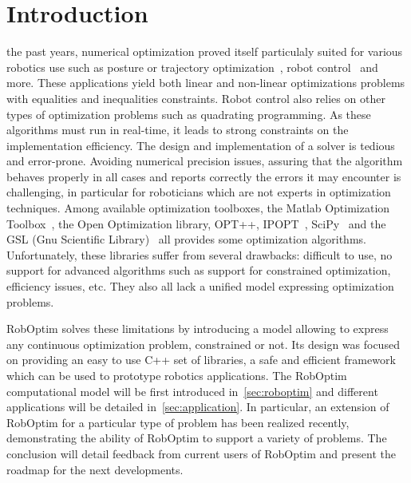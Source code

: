 \documentclass[conference,final,a4paper,twocolumn,9pt]{IEEEtran}
\begin{document}
\section{Introduction}\label{sec:introduction}


 the past years, numerical optimization proved
itself particulaly suited for various robotics use such as posture or
trajectory optimization~\cite{miossec06,saab-tro-12}, robot
control~\cite{mansard-icra-12} and more. These applications yield both
linear and non-linear optimizations problems with equalities and
inequalities constraints. Robot control also relies on other types of
optimization problems such as quadrating programming. As these
algorithms must run in real-time, it leads to strong constraints on
the implementation efficiency. The design and implementation of a
solver is tedious and error-prone. Avoiding numerical precision
issues, assuring that the algorithm behaves properly in all cases and
reports correctly the errors it may encounter is challenging, in
particular for roboticians which are not experts in optimization
techniques. Among available optimization toolboxes, the Matlab
Optimization Toolbox~\cite{matlab}, the Open Optimization library,
OPT++, IPOPT~\cite{ipopt}, SciPy~\cite{scipy} and the GSL (Gnu
Scientific Library)~\cite{gsl} all provides some optimization
algorithms. Unfortunately, these libraries suffer from several
drawbacks: difficult to use, no support for advanced algorithms such
as support for constrained optimization, efficiency issues, etc. They
also all lack a unified model expressing optimization problems.


RobOptim solves these limitations by introducing a model allowing to
express any continuous optimization problem, constrained or not. Its
design was focused on providing an easy to use C++ set of libraries, a
safe and efficient framework which can be used to prototype robotics
applications. The RobOptim computational model will be first
introduced in~\autoref{sec:roboptim} and different applications will
be detailed in~\autoref{sec:application}. In particular, an extension
of RobOptim for a particular type of problem has been realized
recently, demonstrating the ability of RobOptim to support a variety
of problems. The conclusion will detail feedback from current users of
RobOptim and present the roadmap for the next developments.
\end{document}
